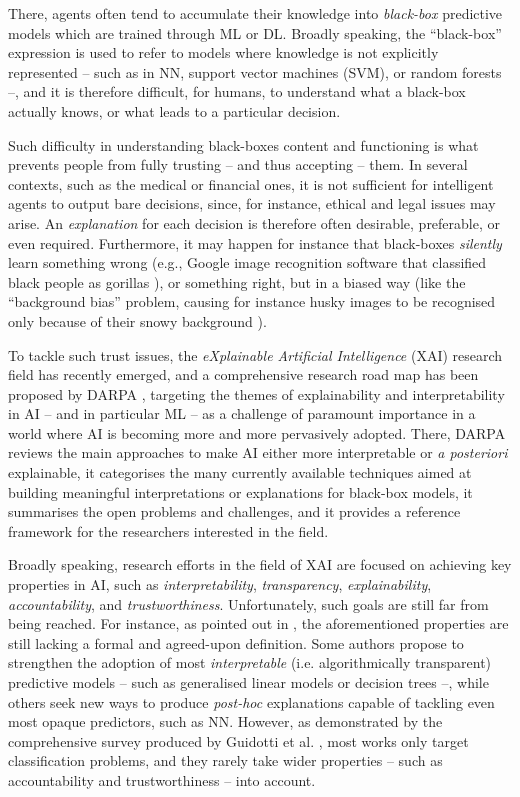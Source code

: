\documentclass[12pt,a4paper,openright,twoside]{book}
\begin{document}
There, agents often tend to accumulate their knowledge into \emph{black-box} predictive models which are trained through ML or DL.
%
Broadly speaking, the ``black-box'' expression is used to refer to models where knowledge is not explicitly represented -- such as in NN, support vector machines (SVM), or random forests --, and it is therefore difficult, for humans, to understand what a black-box actually knows, or what leads to a particular decision.

Such difficulty in understanding black-boxes content and functioning is what prevents people from fully trusting -- and thus accepting -- them.
%
In several contexts, such as the medical or financial ones, it is not sufficient for intelligent agents to output bare decisions, since, for instance, ethical and legal issues may arise. 
%
An \emph{explanation} for each decision is therefore often desirable, preferable, or even required.  
%
Furthermore, it may happen for instance that black-boxes \emph{silently} learn something wrong (e.g., Google image recognition software that classified black people as gorillas \cite{fourcade2017, crawford2016artificial}), or something right, but in a biased way (like  the ``background bias'' problem, causing for instance husky images to be recognised only because of their snowy background \cite{RibeiroSG16}).

To tackle such trust issues, the \emph{eXplainable Artificial Intelligence} (XAI) research field has recently emerged, and a comprehensive research road map has been proposed by DARPA \cite{darpa2016-xai}, targeting the themes of explainability and interpretability in AI -- and in particular ML -- as a challenge of paramount importance in a world where AI is becoming more and more pervasively adopted.
%
There, DARPA reviews the main approaches to make AI either more interpretable or \emph{a posteriori} explainable, it categorises the many currently available techniques aimed at building meaningful interpretations or explanations for black-box models, it summarises the open problems and challenges, and it provides a reference framework for the researchers interested in the field.

Broadly speaking, research efforts in the field of XAI are focused on achieving key properties in AI, such as \emph{interpretability}, \emph{transparency}, \emph{explainability}, \emph{accountability}, and \emph{trustworthiness}.
%
Unfortunately, such goals are still far from being reached.
%
For instance, as pointed out in \cite{Lipton18}, the aforementioned properties are still lacking a formal and agreed-upon definition.
%
Some authors \cite{Rudin2019} propose to strengthen the adoption of most \emph{interpretable} (i.e. algorithmically transparent) predictive models -- such as generalised linear models or decision trees --, while others seek new ways to produce \emph{post-hoc} explanations capable of tackling even most opaque predictors, such as NN.
%
However, as demonstrated by the comprehensive survey produced by Guidotti et al. \cite{GuidottiMRTGP19}, most works only target classification problems, and they rarely take wider properties -- such as accountability and trustworthiness -- into account.
\end{document}
